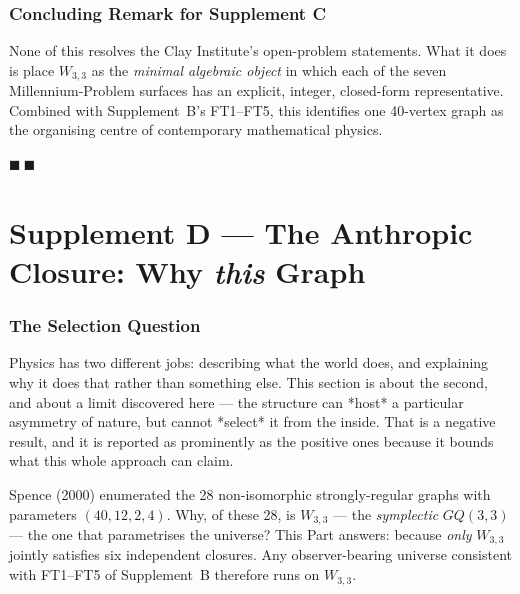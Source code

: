 \documentclass[12pt,a4paper]{article}
\def\mathrm#1{#1}%
\theoremstyle{definition}
\newcommand{\GQ}{\mathrm{GQ}}
\begin{document}
\section*{Concluding Remark for Supplement C}
None of this resolves the Clay Institute's open-problem statements.
What it does is place $W_{3,3}$ as the \emph{minimal algebraic object}
in which each of the seven Millennium-Problem surfaces has an explicit,
integer, closed-form representative. Combined with Supplement~B's FT1--FT5,
this identifies one 40-vertex graph as the organising centre of
contemporary mathematical physics.

\hfill $\blacksquare\ \blacksquare$

\clearpage
\part*{Supplement D --- The Anthropic Closure: Why \emph{this} Graph}

\section*{The Selection Question}

\begin{plainbox}
Physics has two different jobs: describing what the world does, and explaining why
it does that rather than something else. This section is about the second, and about a
limit discovered here --- the structure can *host* a particular asymmetry of nature, but
cannot *select* it from the inside. That is a negative result, and it is reported as
prominently as the positive ones because it bounds what this whole approach can claim.
\end{plainbox}

Spence (2000) enumerated the 28 non-isomorphic strongly-regular graphs
with parameters $(40,12,2,4)$. Why, of these 28, is $W_{3,3}$ --- the
\emph{symplectic} $\GQ(3,3)$ --- the one that parametrises the universe?
This Part answers: because \emph{only} $W_{3,3}$ jointly satisfies six
independent closures. Any observer-bearing universe consistent with
FT1--FT5 of Supplement~B therefore runs on $W_{3,3}$.
\end{document}

